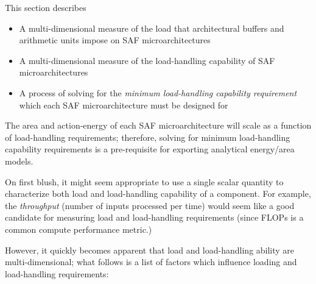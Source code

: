 This section describes
\begin{itemize}
\item A multi-dimensional measure of the load that architectural buffers and arithmetic units impose on SAF microarchitectures
\item A multi-dimensional measure of the load-handling capability of SAF microarchitectures
\item A process of solving for the \textit{minimum load-handling capability requirement} which each SAF microarchitecture must be designed for
\end{itemize}

The area and action-energy of each SAF microarchitecture will scale as a function of load-handling requirements; therefore, solving for minimum load-handling capability requirements is a pre-requisite for exporting analytical energy/area models.

On first blush, it might seem appropriate to use a single scalar quantity to characterize both load and load-handling capability of a component. For example, the \textit{throughput} (number of inputs processed per time) would seem like a good candidate for measuring load and load-handling requirements (since FLOPs is a common compute performance metric.)

However, it quickly becomes apparent that load and load-handling ability are multi-dimensional; what follows is a list of factors which influence loading and load-handling requirements:

